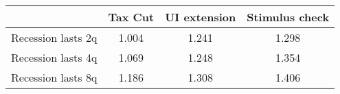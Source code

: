 \begin{tabular}{@{}lccc@{}}
\toprule
& Tax Cut    & UI extension    & Stimulus check    \\  \midrule
Recession lasts 2q &1.004  & 1.241  & 1.298     \\
Recession lasts 4q &1.069  & 1.248  & 1.354     \\
Recession lasts 8q &1.186  & 1.308  & 1.406     \\
\end{tabular}

